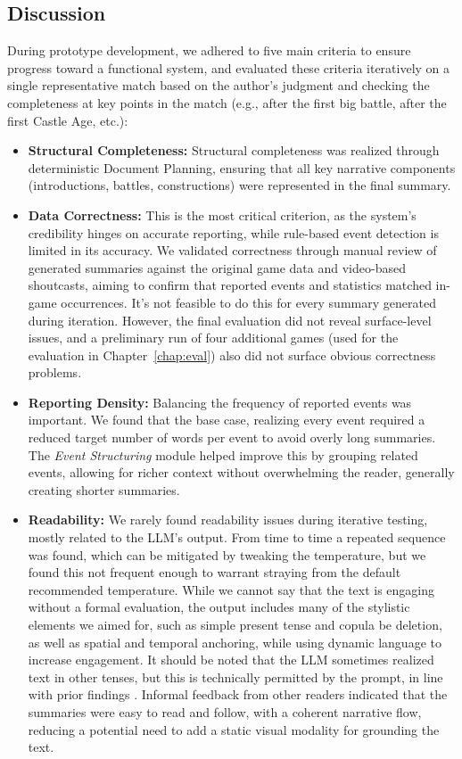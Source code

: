 \subsection{Discussion}
During prototype development, we adhered to five main criteria to ensure progress toward a functional system, and evaluated these criteria iteratively on a single representative match based on the author's judgment and checking the completeness at key points in the match (e.g., after the first big battle, after the first Castle Age, etc.):
\begin{itemize}
  \item \textbf{Structural Completeness:} Structural completeness was realized through deterministic Document Planning, ensuring that all key narrative components (introductions, battles, constructions) were represented in the final summary.
  \item \textbf{Data Correctness:} This is the most critical criterion, as the system's credibility hinges on accurate reporting, while rule-based event detection is limited in its accuracy. We validated correctness through manual review of generated summaries against the original game data and video-based shoutcasts, aiming to confirm that reported events and statistics matched in-game occurrences. It's not feasible to do this for every summary generated during iteration. However, the final evaluation did not reveal surface-level issues, and a preliminary run of four additional games (used for the evaluation in Chapter~\ref{chap:eval}) also did not surface obvious correctness problems.
  \item \textbf{Reporting Density:} Balancing the frequency of reported events was important. We found that the base case, realizing every event required a reduced target number of words per event to avoid overly long summaries. The \textit{Event Structuring} module helped improve this by grouping related events, allowing for richer context without overwhelming the reader, generally creating shorter summaries.
  \item \textbf{Readability:} We rarely found readability issues during iterative testing, mostly related to the LLM's output. From time to time a repeated sequence was found, which can be mitigated by tweaking the temperature, but we found this not frequent enough to warrant straying from the default recommended temperature. While we cannot say that the text is engaging without a formal evaluation, the output includes many of the stylistic elements we aimed for, such as simple present tense and copula be deletion, as well as spatial and temporal anchoring, while using dynamic language to increase engagement. It should be noted that the LLM sometimes realized text in other tenses, but this is technically permitted by the prompt, in line with prior findings \cite{lewandowski2012}. Informal feedback from other readers indicated that the summaries were easy to read and follow, with a coherent narrative flow, reducing a potential need to add a static visual modality for grounding the text.

\end{itemize}
